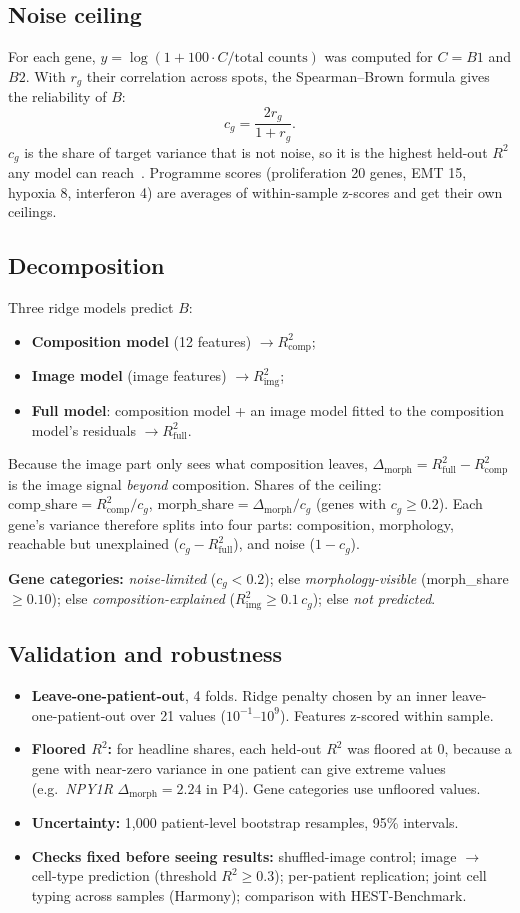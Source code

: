 \documentclass[11pt,a4paper]{article}
\newcommand{\Rc}{R^2_{\mathrm{comp}}}
\newcommand{\Ri}{R^2_{\mathrm{img}}}
\newcommand{\Rf}{R^2_{\mathrm{full}}}
\newcommand{\dm}{\Delta_{\mathrm{morph}}}
\begin{document}
\subsection{Noise ceiling}
For each gene, $y=\log(1+100\cdot C/\text{total counts})$ was computed for $C=B1$ and $B2$. With $r_g$ their correlation across spots, the Spearman--Brown formula gives the reliability of $B$:
\[
c_g = \frac{2r_g}{1+r_g}.
\]
$c_g$ is the share of target variance that is not noise, so it is the highest held-out $R^2$ any model can reach~\cite{lagecastellanos2019noise}. Programme scores (proliferation 20 genes, EMT 15, hypoxia 8, interferon 4) are averages of within-sample z-scores and get their own ceilings.

\subsection{Decomposition}
Three ridge models predict $B$:
\begin{itemize}
  \item \textbf{Composition model} (12 features) $\rightarrow \Rc$;
  \item \textbf{Image model} (image features) $\rightarrow \Ri$;
  \item \textbf{Full model}: composition model + an image model fitted to the composition model's residuals $\rightarrow \Rf$.
\end{itemize}
Because the image part only sees what composition leaves, $\dm = \Rf - \Rc$ is the image signal \emph{beyond} composition. Shares of the ceiling: $\text{comp\_share}=\Rc/c_g$, $\text{morph\_share}=\dm/c_g$ (genes with $c_g\ge0.2$). Each gene's variance therefore splits into four parts: composition, morphology, reachable but unexplained ($c_g-\Rf$), and noise ($1-c_g$).

\textbf{Gene categories:} \emph{noise-limited} ($c_g<0.2$); else \emph{morphology-visible} (morph\_share $\ge0.10$); else \emph{composition-explained} ($\Ri\ge0.1\,c_g$); else \emph{not predicted}.

\subsection{Validation and robustness}
\begin{itemize}
  \item \textbf{Leave-one-patient-out}, 4 folds. Ridge penalty chosen by an inner leave-one-patient-out over 21 values ($10^{-1}$--$10^{9}$). Features z-scored within sample.
  \item \textbf{Floored $R^2$:} for headline shares, each held-out $R^2$ was floored at 0, because a gene with near-zero variance in one patient can give extreme values (e.g.\ \textit{NPY1R} $\dm=2.24$ in P4). Gene categories use unfloored values.
  \item \textbf{Uncertainty:} 1,000 patient-level bootstrap resamples, 95\% intervals.
  \item \textbf{Checks fixed before seeing results:} shuffled-image control; image $\rightarrow$ cell-type prediction (threshold $R^2\ge0.3$); per-patient replication; joint cell typing across samples (Harmony); comparison with HEST-Benchmark.
\end{itemize}
\end{document}
